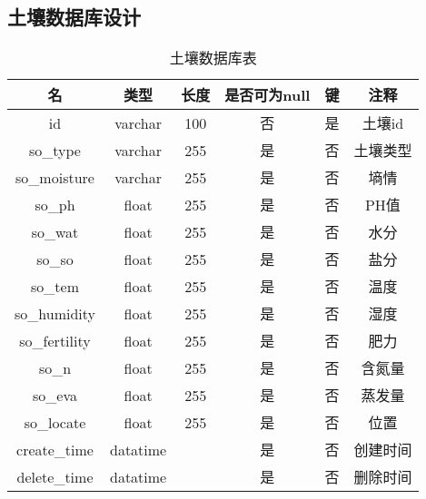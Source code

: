\subsection{土壤数据库设计}
\begin{table}[H]
	\centering
	\caption[土壤数据]{土壤数据库表}
	\begin{tabular}{cccccc}
		\toprule
		名            & 类型      & 长度 &是否可为null & 键 & 注释\\
		\midrule
		id           & varchar  & 100  & 否 & 是 & 土壤id \\
		so\_type     & varchar  & 255  &是  & 否 & 土壤类型   \\
		so\_moisture & varchar  & 255  &是  & 否 & 墒情   \\
		so\_ph       & float    & 255  &是  & 否 & PH值 \\
		so\_wat      & float    & 255  &是  & 否 & 水分   \\
		so\_so       & float    & 255  & 是 & 否 & 盐分     \\
        so\_tem       & float    & 255  & 是 & 否 & 温度     \\
        so\_humidity & float    & 255  & 是 & 否 & 湿度     \\
        so\_fertility & float    & 255  & 是 & 否 & 肥力     \\
        so\_n       & float    & 255  & 是 & 否 & 含氮量     \\
        so\_eva     & float    & 255  & 是 & 否 & 蒸发量     \\
        so\_locate  & float    & 255  & 是 & 否 & 位置     \\
		create\_time  & datatime &      &是  & 否 & 创建时间   \\
		delete\_time  &datatime  &      & 是 & 否 & 删除时间   \\ 
		\bottomrule
	\end{tabular}
\end{table}

